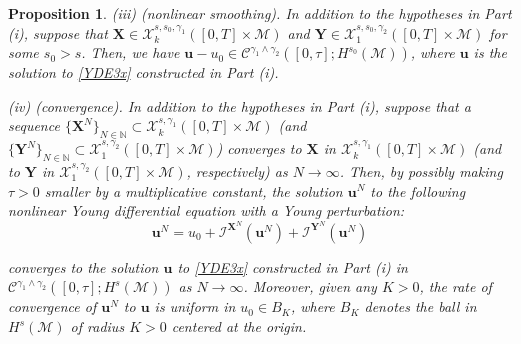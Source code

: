 \documentclass[letterpaper, 11pt,  reqno]{amsart}
\newtheorem{proposition}[theorem]{Proposition}
\newcommand{\1}{\hspace{0.5mm}\textup{I}\hspace{0.5mm}}
\newcommand{\I}{\mathcal{I}}
\newcommand{\noi}{\noindent}
\newcommand{\CC}{\mathcal{C}}
\newcommand{\g}{\gamma}
\newcommand{\M}{\mathcal{M}}
\newcommand{\N}{\mathbb{N}}
\newcommand{\cC}{\mathcal{C}}
\newcommand{\cX}{\mathcal{X}}
\newcommand{\uu}{\mathbf{u}}
\newcommand{\XX}{\mathbf{X}}
\newcommand{\YY}{\mathbf{Y}}
\numberwithin{equation}{section}
\numberwithin{theorem}{section}
\begin{document}
\begin{proposition}
\smallskip

\noi
\textup{(iii) (nonlinear smoothing).}
In addition to the hypotheses in Part (i), 
suppose  that  $\XX \in \cX^{s, s_0, \g_1}_k([0, T]\times \M)$
and $\YY \in \cX^{s, s_0, \g_2}_1([0, T]\times \M)$
for some $s_0 > s$.
Then, we have
 $\uu - u_0 \in \cC^{\g_1\wedge \g_2}([0, \tau]; H^{s_0}(\M))$, 
 where $\uu$ is the solution to \eqref{YDE3x}
 constructed in Part (i).




\smallskip

\noi
\textup{(iv) (convergence).}
In addition to the hypotheses in Part (i), 
suppose  that a sequence $\{\XX^N\}_{N \in \N}\subset 
 \cX^{s, \g_1}_k([0, T]\times \M)$
\textup{(}and $\{\YY^N\}_{N \in \N}\subset 
 \cX^{s, \g_2}_1([0, T]\times \M)$\textup{)}
 converges to $\XX$ in 
 $ \cX^{s, \g_1}_k([0, T]\times \M)$
\textup{(}and 
to  $\YY$ in 
 $ \cX^{s, \g_2}_1([0, T]\times \M)$, respectively\textup{)}
  as $N \to \infty$.
Then, 
by possibly making $\tau > 0$ smaller by a multiplicative constant,  the solution 
$\uu^N$  %
to the following nonlinear Young differential equation with a Young 
perturbation\textup{:}
\begin{equation*}
\uu^N = u_0 + \I^{\XX^N}(\uu^N)
+ \I^{\YY^N}(\uu^N)
\end{equation*}

\noi
converges to the solution $\uu$ to \eqref{YDE3x}
constructed in Part (i)  
 in $\CC^{\g_1\wedge \g_2}([0, \tau]; H^s(\M))$
as $N \to \infty$.
Moreover, 
given any $K > 0$, 
the rate of convergence of $\uu^N$ to $\uu$ is
uniform in $u_0 \in B_K$,  
where
$B_K$ denotes the  ball 
in $H^s(\M)$
of radius $K > 0$ centered at the origin.



\end{proposition}
\end{document}
